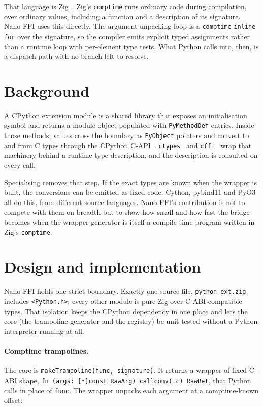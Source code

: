 \documentclass{jot}
\begin{document}
That language is Zig~\cite{zig}. Zig's \texttt{comptime} runs ordinary code during compilation, over ordinary values, including a function and a description of its signature. Nano-FFI uses this directly. The argument-unpacking loop is a \texttt{comptime} \texttt{inline for} over the signature, so the compiler emits explicit typed assignments rather than a runtime loop with per-element type tests. What Python calls into, then, is a dispatch path with no branch left to resolve.

\section{Background}

A CPython extension module is a shared library that exposes an initialisation symbol and returns a module object populated with \texttt{PyMethodDef} entries. Inside those methods, values cross the boundary as \texttt{PyObject} pointers and convert to and from C types through the CPython C-API~\cite{capi}. \texttt{ctypes}~\cite{ctypes} and \texttt{cffi}~\cite{cffi} wrap that machinery behind a runtime type description, and the description is consulted on every call.

Specialising removes that step. If the exact types are known when the wrapper is built, the conversions can be emitted as fixed code. Cython, pybind11 and PyO3 all do this, from different source languages. Nano-FFI's contribution is not to compete with them on breadth but to show how small and how fast the bridge becomes when the wrapper generator is itself a compile-time program written in Zig's \texttt{comptime}.

\section{Design and implementation}

Nano-FFI holds one strict boundary. Exactly one source file, \texttt{python\_ext.zig}, includes \texttt{<Python.h>}; every other module is pure Zig over C-ABI-compatible types. That isolation keeps the CPython dependency in one place and lets the core (the trampoline generator and the registry) be unit-tested without a Python interpreter running at all.

\paragraph{Comptime trampolines.}
The core is \texttt{makeTrampoline(func, signature)}. It returns a wrapper of fixed C-ABI shape, \texttt{fn (args: [*]const RawArg) callconv(.c) RawRet}, that Python calls in place of \texttt{func}. The wrapper unpacks each argument at a comptime-known offset:
\end{document}
